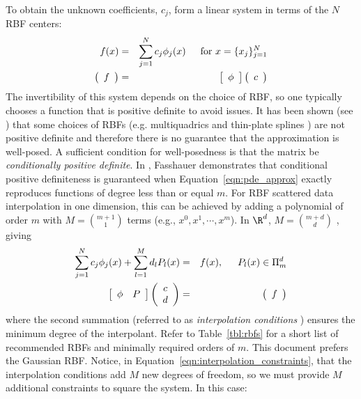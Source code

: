 \documentclass[11pt]{report}
\begin{document}
{To obtain the unknown coefficients, $c_j$, form a linear system in terms of the $N$ RBF centers:
\begin{eqnarray*}
f(x) & = & \sum_{j=1}^{N} c_{j}  \phi_j(x)  \hskip1.5em \textrm{for\ } x = \{x_j\}_{j = 1}^{N} \\
 \parray{c}{ f } & =&  \barray{c}{\phi}\parray{c}{ c } 
\end{eqnarray*}
The invertibility of this system depends on the choice of RBF, so one typically chooses a function that is positive definite to avoid issues. It has been shown (see \cite{Fasshauer2007, Iske2004}) that some choices of RBFs (e.g. multiquadrics and thin-plate splines \cite{Hon2001}) are not positive definite and therefore there is no guarantee that the approximation is well-posed. A sufficient condition for well-posedness is that the matrix be \emph{conditionally positive definite}. In \cite{Fasshauer2007}, Fasshauer demonstrates that conditional positive definiteness is guaranteed when Equation~\ref{eqn:pde_approx} exactly reproduces functions of degree less than or equal $m$. 
For RBF scattered data interpolation in one dimension, this can be achieved by adding a polynomial of order $m$ with $M =$${m+1}\choose{1}$ terms (e.g., $x^0, x^1, \cdots, x^{m}$). 
In $\R^d$, $M =$${m+d}\choose{d}$ \cite{Iske2004}, giving
\begin{eqnarray}
\sum_{j=1}^{N} c_{j}  \phi_j(x)  +  \sum_{l=1}^{M} d_{l} P_l(x) & = & f(x),  \hskip1.5em  P_l(x) \in \Pi^{d}_{m} \label{eqn:interpolation_constraints} \\
\left[ \begin{array}{c c} 
	\phi & P
	\end{array} \right] \left( \begin{array}{c}
							c \\
							d
							 \end{array}
						 \right) & = & \parray{c}{ f } \nonumber
\end{eqnarray}
where the second summation (referred to as \emph{interpolation conditions} \cite{Iske2004}) ensures the minimum degree of the interpolant. Refer to Table~\ref{tbl:rbfs} for a short list of recommended RBFs and minimally required orders of $m$. This document prefers the Gaussian RBF. Notice, in Equation~\ref{eqn:interpolation_constraints}, that the interpolation conditions add $M$ new degrees of freedom, so we must provide $M$ 
additional constraints to square the system. In this case:
}
\end{document}
